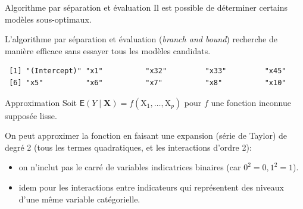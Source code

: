 \documentclass[
  ignorenonframetext,
]{beamer}
\newenvironment{Shaded}{\begin{snugshade}}{\end{snugshade}}
\newcommand{\AttributeTok}[1]{\textcolor[rgb]{0.40,0.45,0.13}{#1}}
\newcommand{\CommentTok}[1]{\textcolor[rgb]{0.37,0.37,0.37}{#1}}
\newcommand{\ConstantTok}[1]{\textcolor[rgb]{0.56,0.35,0.01}{#1}}
\newcommand{\FunctionTok}[1]{\textcolor[rgb]{0.28,0.35,0.67}{#1}}
\newcommand{\NormalTok}[1]{\textcolor[rgb]{0.00,0.23,0.31}{#1}}
\newcommand{\OtherTok}[1]{\textcolor[rgb]{0.00,0.23,0.31}{#1}}
\newcommand{\SpecialCharTok}[1]{\textcolor[rgb]{0.37,0.37,0.37}{#1}}
\newcommand{\StringTok}[1]{\textcolor[rgb]{0.13,0.47,0.30}{#1}}
\providecommand{\tightlist}{%
  \setlength{\itemsep}{0pt}\setlength{\parskip}{0pt}}\usepackage{longtable,booktabs,array}
\begin{document}
\begin{frame}[fragile]{Algorithme par séparation et évaluation}
\protect\hypertarget{algorithme-par-suxe9paration-et-uxe9valuation}{}
Il est possible de déterminer certains modèles sous-optimaux.

L'algorithme par séparation et évaluation (\emph{branch and bound})
recherche de manière efficace sans essayer tous les modèles candidats.

\footnotesize

\begin{Shaded}
\end{Shaded}

\begin{verbatim}
 [1] "(Intercept)" "x1"          "x32"         "x33"         "x45"        
 [6] "x5"          "x6"          "x7"          "x8"          "x10"        
\end{verbatim}

\normalsize
\end{frame}

\begin{frame}{Approximation}
\protect\hypertarget{approximation}{}
Soit
\(\mathsf{E}(Y \mid \mathbf{X}) = f(\mathrm{X}_1, \ldots, \mathrm{X}_p)\)
pour \(f\) une fonction inconnue supposée lisse.

On peut approximer la fonction en faisant une expansion (série de
Taylor) de degré 2 (tous les termes quadratiques, et les interactions
d'ordre 2):

\begin{itemize}
\tightlist
\item
  on n'inclut pas le carré de variables indicatrices binaires (car
  \(0^2=0, 1^2=1\)).
\item
  idem pour les interactions entre indicateurs qui représentent des
  niveaux d'une même variable catégorielle.
\end{itemize}
\end{frame}
\end{document}
